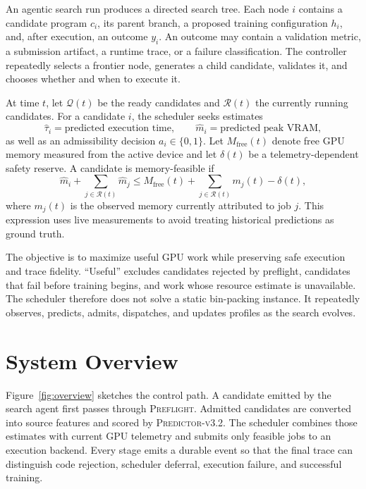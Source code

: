 \documentclass{article}
\newcommand{\preflight}{\textsc{Preflight}}
\newcommand{\predictor}{\textsc{Predictor-v3.2}}
\begin{document}
An agentic search run produces a directed search tree. Each node $i$ contains a candidate program $c_i$, its parent branch, a proposed training configuration $h_i$, and, after execution, an outcome $y_i$. An outcome may contain a validation metric, a submission artifact, a runtime trace, or a failure classification. The controller repeatedly selects a frontier node, generates a child candidate, validates it, and chooses whether and when to execute it.

At time $t$, let $\mathcal{Q}(t)$ be the ready candidates and $\mathcal{R}(t)$ the currently running candidates. For a candidate $i$, the scheduler seeks estimates
\[
  \hat{\tau}_i = \text{predicted execution time}, \qquad
  \hat{m}_i = \text{predicted peak VRAM},
\]
as well as an admissibility decision $a_i\in\{0,1\}$. Let $M_{\mathrm{free}}(t)$ denote free GPU memory measured from the active device and let $\delta(t)$ be a telemetry-dependent safety reserve. A candidate is memory-feasible if
\begin{equation}
  \hat{m}_i + \sum_{j\in\mathcal{R}(t)} \hat{m}_j
  \leq M_{\mathrm{free}}(t) + \sum_{j\in\mathcal{R}(t)}m_j(t) - \delta(t),
  \label{eq:feasibility}
\end{equation}
where $m_j(t)$ is the observed memory currently attributed to job $j$. This expression uses live measurements to avoid treating historical predictions as ground truth.

The objective is to maximize useful GPU work while preserving safe execution and trace fidelity. ``Useful'' excludes candidates rejected by preflight, candidates that fail before training begins, and work whose resource estimate is unavailable. The scheduler therefore does not solve a static bin-packing instance. It repeatedly observes, predicts, admits, dispatches, and updates profiles as the search evolves.

\section{System Overview}
\label{sec:overview}

Figure~\ref{fig:overview} sketches the control path. A candidate emitted by the search agent first passes through \preflight. Admitted candidates are converted into source features and scored by \predictor. The scheduler combines those estimates with current GPU telemetry and submits only feasible jobs to an execution backend. Every stage emits a durable event so that the final trace can distinguish code rejection, scheduler deferral, execution failure, and successful training.
\end{document}
